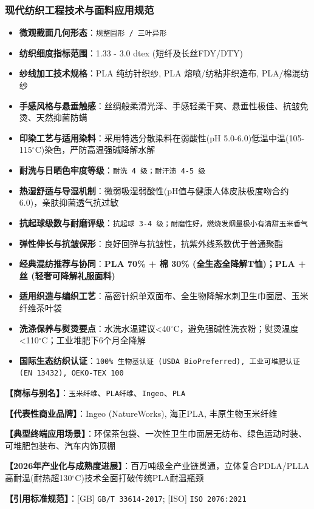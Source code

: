 \documentclass[11pt,openright,twoside,UTF8]{ctexbook}
\begin{document}
\subsubsection*{现代纺织工程技术与面料应用规范}
\begin{itemize} \setlength{\itemsep}{2pt}
    \item \textbf{微观截面几何形态}：\texttt{规整圆形 / 三叶异形}
    \item \textbf{纺织细度指标范围}：1.33 - 3.0 dtex (短纤及长丝FDY/DTY)
    \item \textbf{纱线加工技术规格}：PLA 纯纺针织纱, PLA 熔喷/纺粘非织造布, PLA/棉混纺纱
    \item \textbf{手感风格与悬垂触感}：丝绸般柔滑光泽、手感轻柔干爽、悬垂性极佳、抗皱免烫、天然抑菌防螨
    \item \textbf{印染工艺与适用染料}：采用特选分散染料在弱酸性(pH 5.0-6.0)低温中温(105-115$^\circ\mathrm{C}$)染色，严防高温强碱降解水解
    \item \textbf{耐洗与日晒色牢度等级}：\texttt{耐洗 4 级；耐汗渍 4-5 级}
    \item \textbf{热湿舒适与导湿机制}：微弱吸湿弱酸性(pH值与健康人体皮肤极度吻合约6.0)，亲肤抑菌透气抗过敏
    \item \textbf{抗起球级数与耐磨评级}：\texttt{抗起球 3-4 级；耐磨性好，燃烧发烟量极小有清甜玉米香气}
    \item \textbf{弹性伸长与抗皱保形}：良好回弹与抗皱性，抗紫外线系数优于普通聚酯
    \item \textbf{经典混纺推荐与协同}：\textbf{PLA 70\% + 棉 30\% (全生态全降解T恤)；PLA + 丝 (轻奢可降解礼服面料)}
    \item \textbf{适用织造与编织工艺}：高密针织单双面布、全生物降解水刺卫生巾面层、玉米纤维茶叶袋
    \item \textbf{洗涤保养与熨烫要点}：水洗水温建议\textless{}40$^\circ\mathrm{C}$，避免强碱性洗衣粉；熨烫温度\textless{}110$^\circ\mathrm{C}$；工业堆肥下6个月全降解
    \item \textbf{国际生态纺织认证}：\texttt{100\% 生物基认证 (USDA BioPreferred), 工业可堆肥认证 (EN 13432), OEKO-TEX 100}
\end{itemize}
\vspace{0.2cm}

\noindent\textbf{【商标与别名】}：\texttt{玉米纤维}、\texttt{PLA纤维}、\texttt{Ingeo}、\texttt{PLA}\par
\noindent\textbf{【代表性商业品牌】}：Ingeo (NatureWorks), 海正PLA, 丰原生物玉米纤维\par
\noindent\textbf{【典型终端应用场景】}：环保茶包袋、一次性卫生巾面层无纺布、绿色运动时装、可堆肥包装布、汽车内饰顶棚\par
\noindent\textbf{【2026年产业化与成熟度进展】}：百万吨级全产业链贯通，立体复合PDLA/PLLA高耐温(耐热超130$^\circ\mathrm{C}$)技术全面打破传统PLA耐温瓶颈\par
\noindent\textbf{【引用标准规范】}：[GB] \texttt{GB/T 33614-2017}; [ISO] \texttt{ISO 2076:2021}\par
\vspace{0.5cm}
\end{document}
